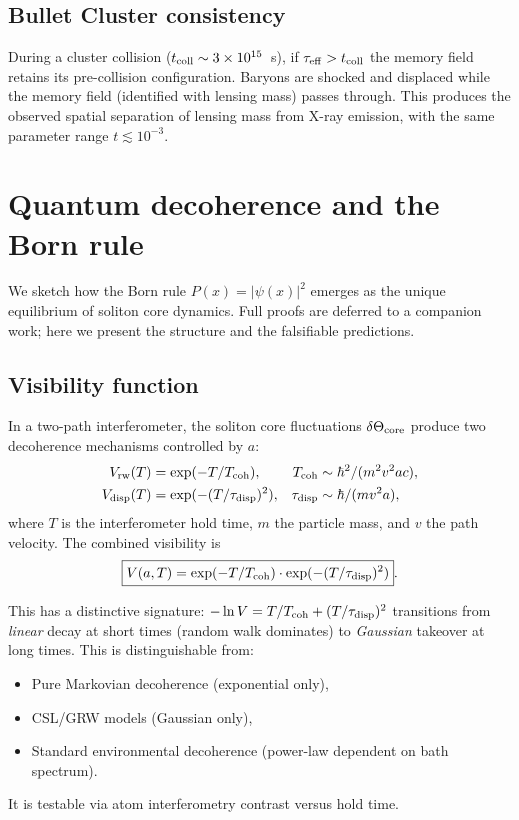 ﻿\documentclass[a4paper,12pt]{article}
\begin{document}
\subsection{Bullet Cluster consistency}

During a cluster collision ($t_{\rm coll}\sim 3\times 10^{15}$~s),
if $\tau_{\rm eff}>t_{\rm coll}$ the memory field retains its
pre-collision configuration.  Baryons are shocked and displaced while
the memory field (identified with lensing mass) passes through.  This
produces the observed spatial separation of lensing mass from X-ray
emission, with the same parameter range $t\lesssim 10^{-3}$.

\section{Quantum decoherence and the Born rule}
\label{sec:born}

We sketch how the Born rule $P(x)=|\psi(x)|^2$ emerges as the unique
equilibrium of soliton core dynamics.  Full proofs are deferred to a
companion work; here we present the structure and the falsifiable
predictions.

\subsection{Visibility function}

In a two-path interferometer, the soliton core fluctuations $\delta\Theta_{\rm core}$ produce two decoherence
mechanisms controlled by $a$:
\begin{align}
  V_{\rm rw}(T) &= \exp(-T/T_{\rm coh}),
    & T_{\rm coh} &\sim \hbar^2/(m^2 v^2 ac),
    \label{eq:Vrw}\\
  V_{\rm disp}(T) &= \exp(-(T/\tau_{\rm disp})^2),
    & \tau_{\rm disp} &\sim \hbar/(m v^2 a),
    \label{eq:Vdisp}
\end{align}
where $T$ is the interferometer hold time, $m$ the particle mass, and
$v$ the path velocity.  The combined visibility is
\begin{equation}
  \boxed{V(a,T) = \exp(-T/T_{\rm coh})\cdot\exp(-(T/\tau_{\rm disp})^2)}.
  \label{eq:V}
\end{equation}

This has a distinctive signature: $-\ln V = T/T_{\rm coh}+(T/\tau_{\rm disp})^2$
transitions from \emph{linear} decay at short times (random walk
dominates) to \emph{Gaussian} takeover at long times.  This is
distinguishable from:
\begin{itemize}
  \item Pure Markovian decoherence (exponential only),
  \item CSL/GRW models (Gaussian only),
  \item Standard environmental decoherence (power-law dependent on bath spectrum).
\end{itemize}
It is testable via atom interferometry contrast versus hold time.
\end{document}
